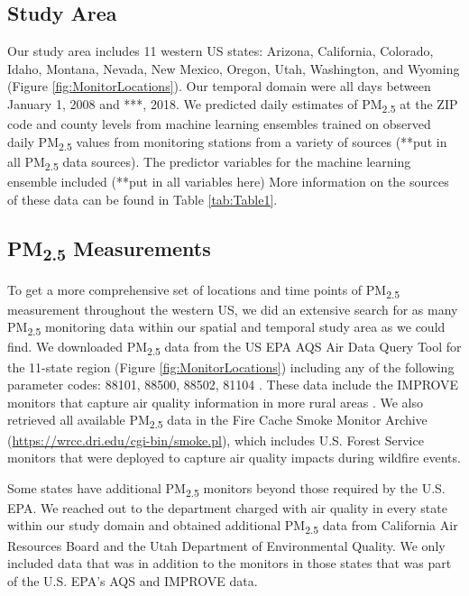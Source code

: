 \documentclass[english]{article}
\begin{document}
\subsection*{Study Area}

Our study area includes 11 western US states: Arizona, California, Colorado, Idaho, Montana, Nevada, New Mexico, Oregon, Utah, Washington, and Wyoming (Figure \ref{fig:MonitorLocations}). Our temporal domain were all days between January 1, 2008 and ***, 2018. We predicted daily estimates of PM\textsubscript{2.5} at the ZIP code and county levels from machine learning ensembles trained on observed daily PM\textsubscript{2.5} values from monitoring stations from a variety of sources (**put in all PM\textsubscript{2.5} data sources). The predictor variables for the machine learning ensemble included (**put in all variables here) %
More information on the sources of these data can be found in Table \ref{tab:Table1}.  


\subsection*{PM\textsubscript{2.5} Measurements}
To get a more comprehensive set of locations and time points of PM\textsubscript{2.5} measurement throughout the western US, we did an extensive search for as many PM\textsubscript{2.5} monitoring data within our spatial and temporal study area as we could find. We downloaded PM\textsubscript{2.5} data from the US EPA AQS Air Data Query Tool \cite{EPAAirData2017}  for the 11-state region (Figure \ref{fig:MonitorLocations}) including any of the following parameter codes: 88101, 88500, 88502, 81104 \cite{EPANPM25Memo2017,EPANPM25Parameters2017,EPANAllParameters2017}. These data include the IMPROVE monitors that capture air quality information in more rural areas \cite{EPANPM25IMPROVE2017}. We also retrieved all available PM\textsubscript{2.5} data in the Fire Cache Smoke Monitor Archive (\url{https://wrcc.dri.edu/cgi-bin/smoke.pl}), which includes U.S. Forest Service monitors that were deployed to capture air quality impacts during wildfire events. 

Some states have additional PM\textsubscript{2.5} monitors beyond those required by the U.S. EPA. We reached out to the department charged with air quality in every state within our study domain and obtained additional PM\textsubscript{2.5} data from California Air Resources Board and the Utah Department of Environmental Quality. We only included data that was in addition to the monitors in those states that was part of the U.S. EPA's AQS and IMPROVE data.   
\end{document}
